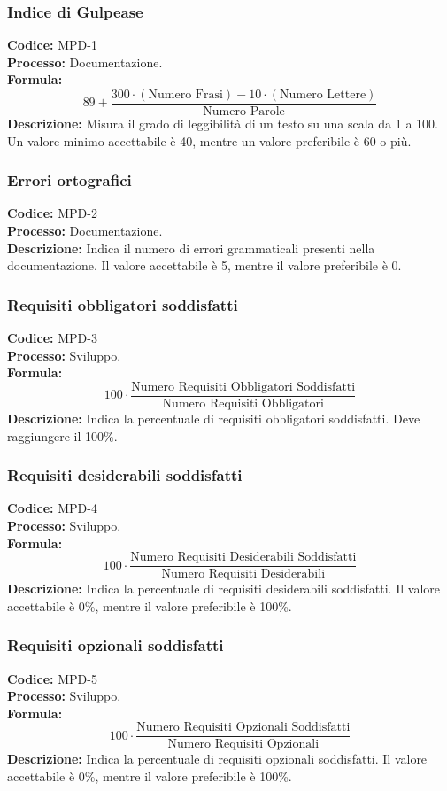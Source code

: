 \subsubsection{Indice di Gulpease}
\textbf{Codice:} MPD-1 \\
\textbf{Processo:} Documentazione. \\
\textbf{Formula:}
\[
89 + \frac{300 \cdot (\text{Numero Frasi}) - 10 \cdot (\text{Numero Lettere})}{\text{Numero Parole}}
\]
\textbf{Descrizione:} Misura il grado di leggibilità di un testo su una scala da 1 a 100. Un valore minimo accettabile è 40, mentre un valore preferibile è 60 o più.

\subsubsection{Errori ortografici}
\textbf{Codice:} MPD-2 \\
\textbf{Processo:} Documentazione. \\
\textbf{Descrizione:} Indica il numero di errori grammaticali presenti nella documentazione. Il valore accettabile è 5, mentre il valore preferibile è 0.


\subsubsection{Requisiti obbligatori soddisfatti}
\textbf{Codice:} MPD-3 \\
\textbf{Processo:} Sviluppo. \\
\textbf{Formula:}
\[
100 \cdot \frac{\text{Numero Requisiti Obbligatori Soddisfatti}}{\text{Numero Requisiti Obbligatori}}
\]
\textbf{Descrizione:} Indica la percentuale di requisiti obbligatori soddisfatti. Deve raggiungere il 100\%.

\subsubsection{Requisiti desiderabili soddisfatti}
\textbf{Codice:} MPD-4 \\
\textbf{Processo:} Sviluppo. \\
\textbf{Formula:}
\[
100 \cdot \frac{\text{Numero Requisiti Desiderabili Soddisfatti}}{\text{Numero Requisiti Desiderabili}}
\]
\textbf{Descrizione:} Indica la percentuale di requisiti desiderabili soddisfatti. Il valore accettabile è 0\%, mentre il valore preferibile è 100\%.

\subsubsection{Requisiti opzionali soddisfatti}
\textbf{Codice:} MPD-5 \\
\textbf{Processo:} Sviluppo. \\
\textbf{Formula:}
\[
100 \cdot \frac{\text{Numero Requisiti Opzionali Soddisfatti}}{\text{Numero Requisiti Opzionali}}
\]
\textbf{Descrizione:} Indica la percentuale di requisiti opzionali soddisfatti. Il valore accettabile è 0\%, mentre il valore preferibile è 100\%.



